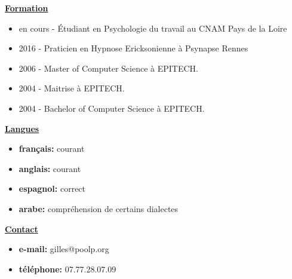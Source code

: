 \documentclass[a4paper,10pt]{letter}
\begin{document}
\underline{\textbf{Formation}}\\
\begin{itemize}
\item en cours - \'Etudiant en Psychologie du travail au CNAM Pays de la Loire
\item 2016 - Praticien en Hypnose Ericksonienne \`a Psynapse Rennes
\item 2006 - Master of Computer Science \`a {EPITECH.}
\item 2004 - Maitrise \`a {EPITECH.}
\item 2004 - Bachelor of Computer Science \`a {EPITECH.}\\
\end{itemize}

\underline{\textbf{Langues}}\\
\begin{itemize}
\item	\textbf{fran\c cais:}	courant
\item	\textbf{anglais:}		courant
\item	\textbf{espagnol:}		correct
\item	\textbf{arabe:}			compr\'ehension de certains dialectes\\
\end{itemize}

\underline{\textbf{Contact}}\\
\begin{itemize}
\item	\textbf{e-mail:}	gilles@poolp.org
\item	\textbf{t\'el\'ephone:}	07.77.28.07.09
\end{itemize}

\pagebreak
\end{document}
